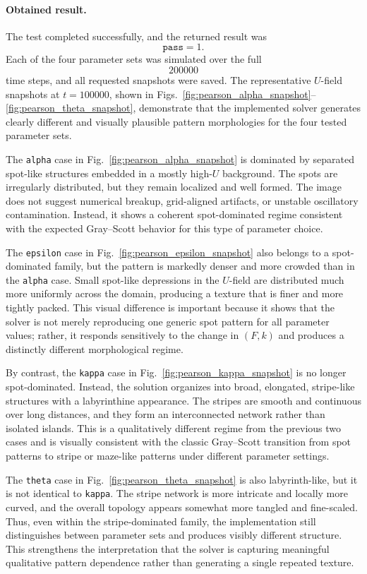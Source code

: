 \paragraph{Obtained result.}
The test completed successfully, and the returned result was
\[
\texttt{pass} = 1.
\]
Each of the four parameter sets was simulated over the full
\[
200000
\]
time steps, and all requested snapshots were saved.
The representative \(U\)-field snapshots at \(t=100000\), shown in Figs.~\ref{fig:pearson_alpha_snapshot}--\ref{fig:pearson_theta_snapshot}, demonstrate that the implemented solver generates clearly different and visually plausible pattern morphologies for the four tested parameter sets.

The \texttt{alpha} case in Fig.~\ref{fig:pearson_alpha_snapshot} is dominated by separated spot-like structures embedded in a mostly high-\(U\) background. The spots are irregularly distributed, but they remain localized and well formed. The image does not suggest numerical breakup, grid-aligned artifacts, or unstable oscillatory contamination. Instead, it shows a coherent spot-dominated regime consistent with the expected Gray--Scott behavior for this type of parameter choice.

The \texttt{epsilon} case in Fig.~\ref{fig:pearson_epsilon_snapshot} also belongs to a spot-dominated family, but the pattern is markedly denser and more crowded than in the \texttt{alpha} case. Small spot-like depressions in the \(U\)-field are distributed much more uniformly across the domain, producing a texture that is finer and more tightly packed. This visual difference is important because it shows that the solver is not merely reproducing one generic spot pattern for all parameter values; rather, it responds sensitively to the change in \((F,k)\) and produces a distinctly different morphological regime.

By contrast, the \texttt{kappa} case in Fig.~\ref{fig:pearson_kappa_snapshot} is no longer spot-dominated. Instead, the solution organizes into broad, elongated, stripe-like structures with a labyrinthine appearance. The stripes are smooth and continuous over long distances, and they form an interconnected network rather than isolated islands. This is a qualitatively different regime from the previous two cases and is visually consistent with the classic Gray--Scott transition from spot patterns to stripe or maze-like patterns under different parameter settings.

The \texttt{theta} case in Fig.~\ref{fig:pearson_theta_snapshot} is also labyrinth-like, but it is not identical to \texttt{kappa}. The stripe network is more intricate and locally more curved, and the overall topology appears somewhat more tangled and fine-scaled. Thus, even within the stripe-dominated family, the implementation still distinguishes between parameter sets and produces visibly different structure. This strengthens the interpretation that the solver is capturing meaningful qualitative pattern dependence rather than generating a single repeated texture.

